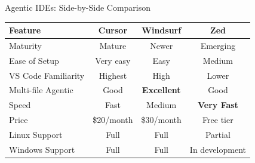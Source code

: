 \documentclass[aspectratio=169,11pt]{beamer}
\begin{document}
\begin{frame}{Agentic IDEs: Side-by-Side Comparison}
    \begin{center}
        \small
        \begin{tabular}{@{}l c c c@{}}
            \toprule
            \textbf{Feature} & \textbf{Cursor} & \textbf{Windsurf} & \textbf{Zed} \\
            \midrule
            Maturity & Mature & Newer & Emerging \\
            Ease of Setup & Very easy & Easy & Medium \\
            VS Code Familiarity & Highest & High & Lower \\
            Multi-file Agentic & Good & \textcolor{Garnet}{\textbf{Excellent}} & Good \\
            Speed & Fast & Medium & \textcolor{Garnet}{\textbf{Very Fast}} \\
            Price & \$20/month & \$30/month & Free tier \\
            Linux Support & Full & Full & Partial \\
            Windows Support & Full & Full & In development \\
            \bottomrule
        \end{tabular}
    \end{center}


\end{frame}
\end{document}
